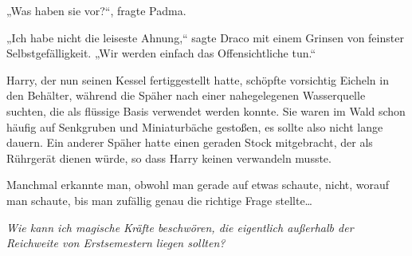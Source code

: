 „Was haben sie vor?“, fragte Padma.

„Ich habe nicht die leiseste Ahnung,“ sagte Draco mit einem Grinsen von feinster Selbstgefälligkeit. „Wir werden einfach das Offensichtliche tun.“

\later

Harry, der nun seinen Kessel fertiggestellt hatte, schöpfte vorsichtig Eicheln in den Behälter, während die Späher nach einer nahegelegenen Wasserquelle suchten, die als flüssige Basis verwendet werden konnte. Sie waren im Wald schon häufig auf Senkgruben und Miniaturbäche gestoßen, es sollte also nicht lange dauern. Ein anderer Späher hatte einen geraden Stock mitgebracht, der als Rührgerät dienen würde, so dass Harry keinen verwandeln musste.

Manchmal erkannte man, obwohl man gerade auf etwas schaute, nicht, worauf man schaute, bis man zufällig genau die richtige Frage stellte…

\emph{Wie kann ich magische Kräfte beschwören, die eigentlich außerhalb der Reichweite von Erstsemestern liegen sollten?}

